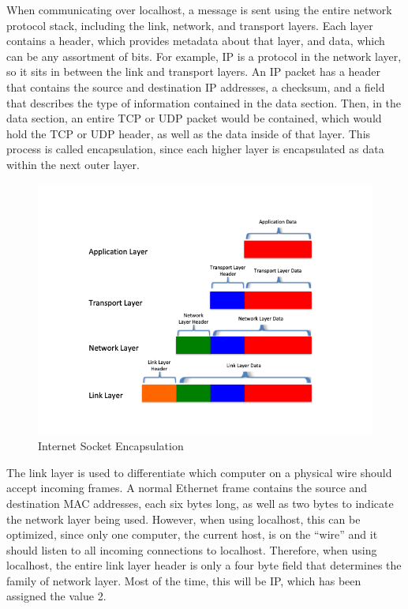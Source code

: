 When communicating over localhost, a message is sent using the entire network protocol stack, including the link, network, and transport layers.  Each layer contains a header, which provides metadata about that layer, and data, which can be any assortment of bits.  For example, IP is a protocol in the network layer, so it sits in between the link and transport layers.  An IP packet has a header that contains the source and destination IP addresses, a checksum, and a field that describes the type of information contained in the data section.  Then, in the data section, an entire TCP or UDP packet would be contained, which would hold the TCP or UDP header, as well as the data inside of that layer.  This process is called encapsulation, since each higher layer is encapsulated as data within the next outer layer.

\begin{figure}
\centering
\includegraphics[width=1\textwidth]{encapsulation.png}
\caption{Internet Socket Encapsulation}
\label{fig:myfig}
\end{figure}

The link layer is used to differentiate which computer on a physical wire should accept incoming frames.  A normal Ethernet frame contains the source and destination MAC addresses, each six bytes long, as well as two bytes to indicate the network layer being used.  However, when using localhost, this can be optimized, since only one computer, the current host, is on the ``wire'' and it should listen to all incoming connections to localhost.  Therefore, when using localhost, the entire link layer header is only a four byte field that determines the family of network layer.  Most of the time, this will be IP, which has been assigned the value 2.

